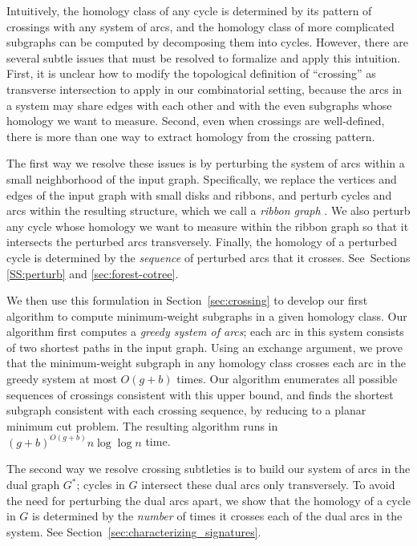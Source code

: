 \documentclass[letterpaper,review]{siamart190516}
\begin{document}
Intuitively, the homology class of any cycle is determined by its pattern of crossings with any system of arcs, and the homology class of more complicated subgraphs can be computed by decomposing them into cycles.  However, there are several subtle issues that must be resolved to formalize and apply this intuition.  First, it is unclear how to modify the topological definition of “crossing” as transverse intersection to apply in our combinatorial setting, because the arcs in a system may share edges with each other and with the even subgraphs whose homology we want to measure.  Second, even when crossings are well-defined, there is more than one way to extract homology from the crossing pattern.

The first way we resolve these issues is by perturbing the system of arcs within a small neighborhood of the input graph.  Specifically, we replace the vertices and edges of the input graph with small disks and ribbons, and perturb cycles and arcs within the resulting structure, which we call a \emph{ribbon graph} \cite{l-gos-2004,em-gos-13,l-gem-82}.  We also perturb any cycle whose homology we want to measure within the ribbon graph so that it intersects the perturbed arcs transversely.  Finally, the homology of a perturbed cycle is determined by the \emph{sequence} of perturbed arcs that it crosses.  See~Sections \ref{SS:perturb} and \ref{sec:forest-cotree}. 

We then use this formulation in Section~\ref{sec:crossing} to develop our first algorithm to compute minimum-weight subgraphs in a given homology class.  Our algorithm first computes a \emph{greedy system of arcs}; each arc in this system consists of two shortest paths in the input graph.  Using an exchange argument, we prove that the minimum-weight subgraph in any homology class crosses each arc in the greedy system at most $O(g+b)$ times.  Our algorithm enumerates all possible sequences of crossings consistent with this upper bound, and finds the shortest subgraph consistent with each crossing sequence, by reducing to a planar minimum cut problem.  The resulting algorithm runs in $(g+b)^{O(g+b)}n\log \log n$ time.

The second way we resolve crossing subtleties is to build our system of arcs in the dual graph $G^*$; cycles in $G$ intersect these dual arcs only transversely.  To avoid the need for perturbing the dual arcs apart, we show that the homology of a cycle in $G$ is determined by the \emph{number} of times it crosses each of the dual arcs in the system.  See Section~\ref{sec:characterizing_signatures}.
\end{document}
